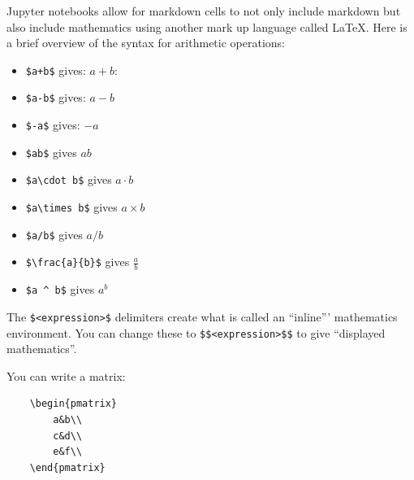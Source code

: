 Jupyter notebooks allow for markdown cells to not only include markdown but also
include mathematics using another mark up language called \LaTeX.
Here is a brief overview of the syntax for arithmetic operations:
\begin{itemize}
\item 

\texttt{\$a+b\$} gives: \(a + b\):

\item 

\texttt{\$a-b\$} gives: \(a-b\)

\item 

\texttt{\$-a\$} gives: \(-a\)

\item 

\texttt{\$ab\$} gives \(ab\)

\item 

\texttt{\$a\textbackslash{}cdot b\$} gives \(a\cdot b\)

\item 

\texttt{\$a\textbackslash{}times b\$} gives \(a\times b\)

\item 

\texttt{\$a/b\$} gives \(a/b\)

\item 

\texttt{\$\textbackslash{}frac\{a\}\{b\}\$} gives \(\frac{a}{b}\)

\item 

\texttt{\$a \textasciicircum{} b\$} gives \(a ^ b\)

\end{itemize}


The \texttt{\$<expression>\$} delimiters create what is called an ``inline'''
mathematics environment.
You can change these to \texttt{\$\$<expression>\$\$} to give ``displayed
mathematics''.


You can write a matrix:

\begin{verbatim}
    \begin{pmatrix}
        a&b\\
        c&d\\
        e&f\\
    \end{pmatrix}
\end{verbatim}


